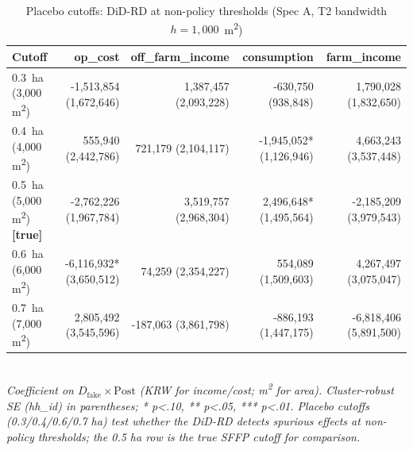 \begin{table}[ht]
\centering
\caption{Placebo cutoffs: DiD-RD at non-policy thresholds (Spec A, T2 bandwidth $h=1{,}000$~m\textsuperscript{2})}
\label{tab:placebo-cutoffs}
\small
\begin{tabular}{lrrrr}
\toprule
Cutoff & op\_cost & off\_farm\_income & consumption & farm\_income \\
\midrule
0.3~ha (3,000 m\textsuperscript{2}) & -1,513,854 (1,672,646) & 1,387,457 (2,093,228) & -630,750 (938,848) & 1,790,028 (1,832,650) \\
0.4~ha (4,000 m\textsuperscript{2}) & 555,940 (2,442,786) & 721,179 (2,104,117) & -1,945,052* (1,126,946) & 4,663,243 (3,537,448) \\
0.5~ha (5,000 m\textsuperscript{2}) \textbf{[true]} & -2,762,226 (1,967,784) & 3,519,757 (2,968,304) & 2,496,648* (1,495,564) & -2,185,209 (3,979,543) \\
0.6~ha (6,000 m\textsuperscript{2}) & -6,116,932* (3,650,512) & 74,259 (2,354,227) & 554,089 (1,509,603) & 4,267,497 (3,075,047) \\
0.7~ha (7,000 m\textsuperscript{2}) & 2,805,492 (3,545,596) & -187,063 (3,861,798) & -886,193 (1,447,175) & -6,818,406 (5,891,500) \\
\bottomrule
\end{tabular}
\\
\footnotesize\textit{Coefficient on $D_{\text{fake}} \times \text{Post}$ (KRW for income/cost; m\textsuperscript{2} for area). Cluster-robust SE (hh\_id) in parentheses; * p<.10, ** p<.05, *** p<.01. Placebo cutoffs (0.3/0.4/0.6/0.7 ha) test whether the DiD-RD detects spurious effects at non-policy thresholds; the 0.5 ha row is the true SFFP cutoff for comparison.}
\end{table}

